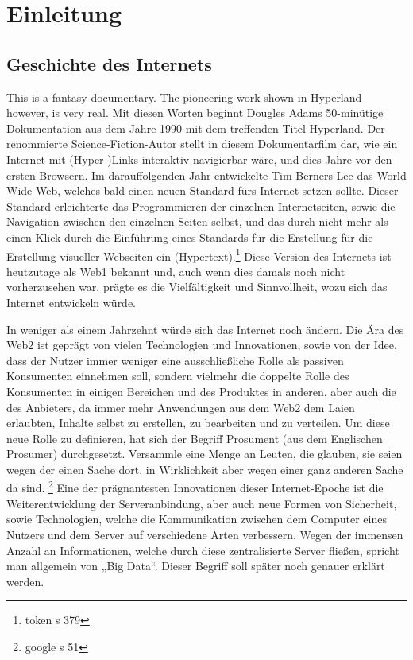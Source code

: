 \chapter{Einleitung}

\section{Geschichte des Internets}

This is a fantasy documentary. The pioneering work shown in Hyperland however, is very real.
Mit diesen Worten beginnt Dougles Adams 50-minütige Dokumentation aus dem Jahre 1990 mit dem treffenden Titel Hyperland. Der renommierte Science-Fiction-Autor stellt in diesem Dokumentarfilm dar, wie ein Internet mit (Hyper-)Links interaktiv navigierbar wäre, und dies Jahre vor den ersten Browsern.
Im darauffolgenden Jahr entwickelte Tim Berners-Lee das World Wide Web, welches bald einen neuen Standard fürs Internet setzen sollte. Dieser Standard erleichterte das Programmieren der einzelnen Internetseiten, sowie die Navigation zwischen den einzelnen Seiten selbst, und das durch nicht mehr als einen Klick durch die Einführung eines Standards für die Erstellung für die Erstellung visueller Webseiten ein (Hypertext).\footnote{token s 379} Diese Version des Internets ist heutzutage als Web1 bekannt und, auch wenn dies damals noch nicht vorherzusehen war, prägte es die Vielfältigkeit und Sinnvollheit, wozu sich das Internet entwickeln würde.

In weniger als einem Jahrzehnt würde sich das Internet noch ändern. Die Ära des Web2 ist geprägt von vielen Technologien und Innovationen, sowie von der Idee, dass der Nutzer immer weniger eine ausschließliche Rolle als passiven Konsumenten einnehmen soll, sondern vielmehr die doppelte Rolle des Konsumenten in einigen Bereichen und des Produktes in anderen, aber auch die des Anbieters, da immer mehr Anwendungen aus dem Web2 dem Laien erlaubten, Inhalte selbst zu erstellen, zu bearbeiten und zu verteilen. Um diese neue Rolle zu definieren, hat sich der Begriff Prosument (aus dem Englischen Prosumer) durchgesetzt.
Versammle eine Menge an Leuten, die glauben, sie seien wegen der einen Sache dort, in Wirklichkeit aber wegen einer ganz anderen Sache da sind. \footnote{google s 51}
Eine der prägnantesten Innovationen dieser Internet-Epoche ist die Weiterentwicklung der Serveranbindung, aber auch neue Formen von Sicherheit, sowie Technologien, welche die Kommunikation zwischen dem Computer eines Nutzers und dem Server auf verschiedene Arten verbessern. Wegen der immensen Anzahl an Informationen, welche durch diese zentralisierte Server fließen, spricht man allgemein von „Big Data“. Dieser Begriff soll später noch genauer erklärt werden.

